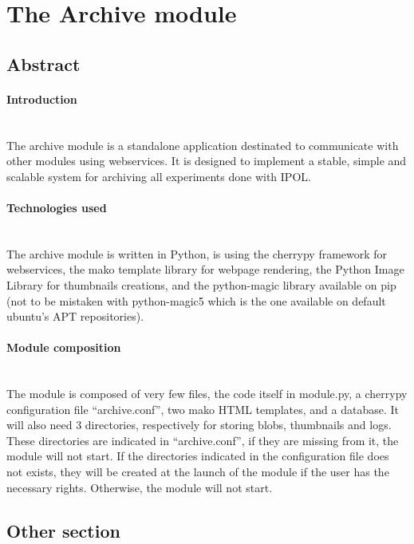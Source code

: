 \section{The Archive module}

\subsection{Abstract}
\label{sec:archive_introduction}
\paragraph{Introduction} \hspace{0pt} \\
The archive module is a standalone application destinated to communicate with other modules using webservices. It is designed to implement a stable, simple and scalable system for archiving all experiments done with IPOL.
\paragraph{Technologies used} \hspace{0pt} \\
The archive module is written in Python, is using the cherrypy framework for webservices, the mako template library for webpage rendering, the Python Image Library for thumbnails creations, and the python-magic library available on pip (not to be mistaken with python-magic5 which is the one available on default ubuntu's APT repositories).
\paragraph{Module composition} \hspace{0pt} \\
The module is composed of very few files, the code itself in module.py, a cherrypy configuration file ``archive.conf'', two mako HTML templates, and a database. It will also need 3 directories, respectively for storing blobs, thumbnails and logs. These directories are indicated in ``archive.conf'', if they are missing from it, the module will not start. If the directories indicated in the configuration file does not exists, they will be created at the launch of the module if the user has the necessary rights. Otherwise, the module will not start.
\subsection{Other section}
